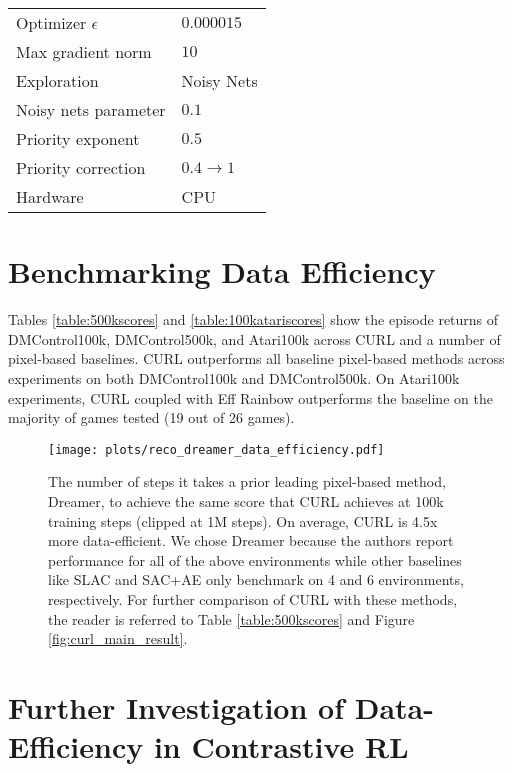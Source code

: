 \documentclass{article}
\begin{document}
\begin{table}[h]
\begin{center}
\begin{small}
\begin{tabular}{ll}
Optimizer $\epsilon$ & $0.000015$ \\
Max gradient norm & $10$ \\ 
Exploration & Noisy Nets   \\
Noisy nets parameter & $0.1$ \\
Priority exponent & $0.5$ \\
Priority correction & $0.4 \rightarrow 1$ \\
Hardware & CPU \\
\bottomrule
\end{tabular}
\end{small}
\end{center}
\vskip -0.1in
\end{table}


\section{Benchmarking Data Efficiency}

Tables \ref{table:500kscores} and \ref{table:100katariscores} show the episode returns of DMControl100k, DMControl500k, and Atari100k across CURL and a number of pixel-based baselines. CURL outperforms all baseline pixel-based methods across experiments on both DMControl100k and DMControl500k. On Atari100k experiments, CURL coupled with Eff Rainbow outperforms the baseline on the majority of games tested (19 out of 26 games).

 \begin{figure}[h]
 \begin{center}
   \centerline{\texttt{[image: plots/reco\_dreamer\_data\_efficiency.pdf]}}
   \caption{The number of steps it takes a prior leading pixel-based method, Dreamer, to achieve the same score that CURL achieves at 100k training steps (clipped at 1M steps). On average, CURL is 4.5x more data-efficient. We chose Dreamer because the authors \cite{hafner2019dream} report performance for all of the above environments while other baselines like SLAC and SAC+AE only benchmark on 4 and 6 environments, respectively. For further comparison of CURL with these methods, the reader is referred to Table \ref{table:500kscores} and Figure \ref{fig:curl_main_result}.
   }
   \label{fig:curl_sample_efficiency}
 \end{center}
 \vskip -0.2in
 \end{figure}
 


\section{Further Investigation of Data-Efficiency in Contrastive RL}
\end{document}
